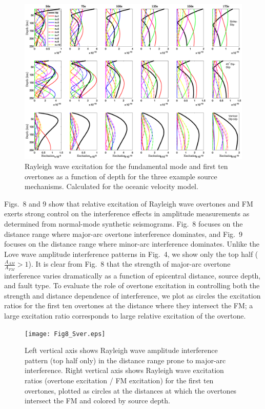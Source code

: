 \documentclass[extra,mreferee]{gji}
\begin{document}
      \begin{figure}
 \includegraphics[width=1.0\textwidth]{Fig7_CorrectedColor.eps}
 \caption{Rayleigh wave excitation for the fundamental mode and first ten overtones as a function of depth for the three example source mechanisms. Calculated for the oceanic velocity model.}
 \end{figure}

 Figs.\ 8 and 9 show that relative excitation of Rayleigh wave overtones and FM exerts strong control on the interference effects in amplitude measurements as determined from normal-mode synthetic seismograms. Fig.\ 8 focuses on the distance range where major-arc overtone interference dominates, and Fig.\ 9 focuses on the distance range where minor-arc interference dominates. Unlike the Love wave amplitude interference patterns in Fig.\ 4, we show only the top half ($\frac{A_{AM}}{A_{FM}}>1$). It is clear from Fig.\ 8 that the strength of major-arc overtone interference varies dramatically as a function of epicentral distance, source depth, and fault type. To evaluate the role of overtone excitation in controlling both the strength and distance dependence of interference, we plot as circles the excitation ratios for the first ten overtones at the distance where they intersect the FM; a large excitation ratio corresponds to large relative excitation of the overtone.

\begin{figure}
 \texttt{[image: Fig8\_Sver.eps]}
 \caption{ Left vertical axis shows Rayleigh wave amplitude interference pattern (top half only) in the distance range prone to major-arc interference. Right vertical axis shows Rayleigh wave excitation ratios (overtone excitation / FM excitation) for the first ten overtones, plotted as circles at the distances at which the overtones intersect the FM and colored by source depth. }
\end{figure}
     
\end{document}

